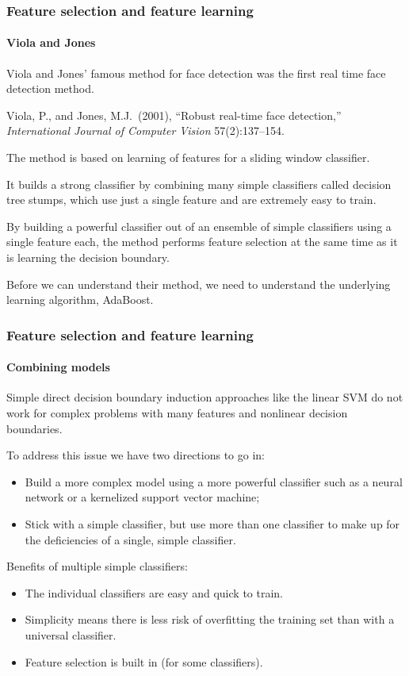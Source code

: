 \documentclass[aspectratio=169]{beamer}
\begin{document}
\begin{frame}
\frametitle{Feature selection and feature learning}
\framesubtitle{Viola and Jones}

Viola and Jones' famous method for face detection was the first real
time face detection method.

\medskip

Viola, P., and Jones, M.J.\ (2001), ``Robust real-time face detection,''
\textit{International Journal of Computer Vision} 57(2):137--154.

\medskip

The method is based on learning of features for a sliding window
classifier.

\medskip

It builds a strong classifier by combining many simple classifiers
called \alert{decision tree stumps}, which use just a single feature
and are extremely easy to train.

\medskip

By building a powerful classifier out of an ensemble of simple
classifiers using a single feature each, the method performs feature
selection \alert{at the same time} as it is learning the decision
boundary.

\medskip

Before we can understand their method, we need to understand the
underlying learning algorithm, \alert{AdaBoost}.

\end{frame}


\begin{frame}
\frametitle{Feature selection and feature learning}
\framesubtitle{Combining models}

Simple direct decision boundary induction approaches like the linear
SVM do not work for complex problems with \alert{many features} and
\alert{nonlinear decision boundaries}.

\medskip

To address this issue we have two directions to go in:
\begin{itemize}
\item Build a \alert{more complex model} using a more powerful
  classifier such as a neural network or a kernelized support vector
  machine;
\item Stick with a simple classifier, but use \alert{more than one
    classifier} to make up for the deficiencies of a single, simple
  classifier.
\end{itemize}

\medskip

Benefits of multiple simple classifiers:
\begin{itemize}
\item The individual classifiers are \alert{easy} and \alert{quick} to
  train.
\item Simplicity means there is less risk of \alert{overfitting the
    training set} than with a universal classifier.
\item Feature selection is \alert{built in} (for some classifiers).
\end{itemize}

\end{frame}
\end{document}
